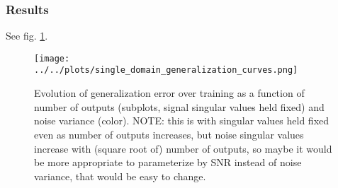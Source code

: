 \documentclass{article}
\begin{document}
\subsubsection{Results}
See fig. \ref{one_domain_results}.
\begin{figure}
\centering
\texttt{[image: ../../plots/single\_domain\_generalization\_curves.png]}
\caption{Evolution of generalization error over training as a function of number of outputs (subplots, signal singular values held fixed) and noise variance (color). NOTE: this is with singular values held fixed even as number of outputs increases, but noise singular values increase with (square root of) number of outputs, so maybe it would be more appropriate to parameterize by SNR instead of noise variance, that would be easy to change.}\label{one_domain_results}
\end{figure}
\end{document}
